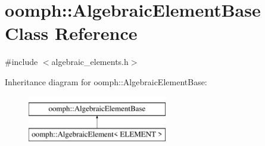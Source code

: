 \hypertarget{classoomph_1_1AlgebraicElementBase}{}\section{oomph\+:\+:Algebraic\+Element\+Base Class Reference}
\label{classoomph_1_1AlgebraicElementBase}


{\ttfamily \#include $<$algebraic\+\_\+elements.\+h$>$}

Inheritance diagram for oomph\+:\+:Algebraic\+Element\+Base\+:\begin{figure}[H]
\begin{center}
\leavevmode
\includegraphics[height=2.000000cm]{classoomph_1_1AlgebraicElementBase}
\end{center}
\end{figure}
